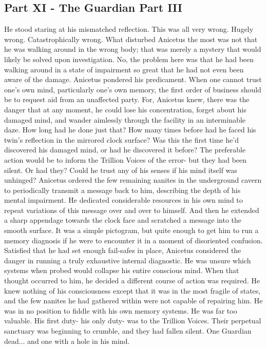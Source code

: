 \documentclass[a4paper]{article}
\begin{document}
\subsection{Part XI - The Guardian Part III}
He stood staring at his mismatched reflection. This was all very wrong. Hugely wrong. Catastrophically wrong.
What disturbed Anicetus the most was not that he was walking around in the wrong body; that was merely a mystery that would likely be solved upon investigation. No, the problem here was that he had been walking around in a state of impairment so great that he had not even been aware of the damage.
Anicetus pondered his predicament. When one cannot trust one's own mind, particularly one's own memory, the first order of business should be to request aid from an unaffected party. For, Anicetus knew, there was the danger that at any moment, he could lose his concentration, forget about his damaged mind, and wander aimlessly through the facility in an interminable daze.
How long had he done just that? How many times before had he faced his twin's reflection in the mirrored clock surface? Was this the first time he'd discovered his damaged mind, or had he discovered it before?
The preferable action would be to inform the Trillion Voices of the error- but they had been silent. Or had they? Could he trust any of his senses if his mind itself was unhinged?
Anicetus ordered the few remaining nanites in the underground cavern to periodically transmit a message back to him, describing the depth of his mental impairment. He dedicated considerable resources in his own mind to repeat variations of this message over and over to himself. And then he extended a sharp appendage towards the clock face and scratched a message into the smooth surface. It was a simple pictogram, but quite enough to get him to run a memory diagnosis if he were to encounter it in a moment of disoriented confusion.
Satisfied that he had set enough fail-safes in place, Anicetus considered the danger in running a truly exhaustive internal diagnostic. He was unsure which systems when probed would collapse his entire conscious mind. When that thought occurred to him, he decided a different course of action was required. He knew nothing of his consciousness except that it was in the most fragile of states, and the few nanites he had gathered within were not capable of repairing him.
He was in no position to fiddle with his own memory systems. He was far too valuable. His first duty- his only duty- was to the Trillion Voices. Their perpetual sanctuary was beginning to crumble, and they had fallen silent. One Guardian dead... and one with a hole in his mind.
\end{document}
